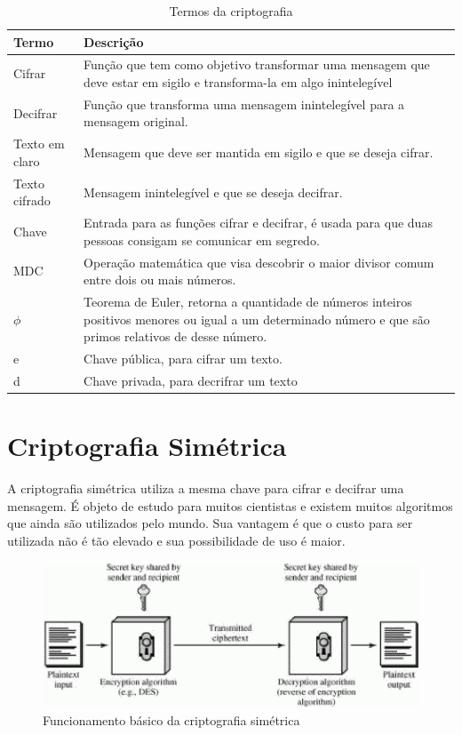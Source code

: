 \begin{table}[h]
\begin{center}
    \begin{tabular}{|l| p{10cm}|}
    \hline
    Termo & Descrição \\ \hline
    Cifrar & Função que tem como objetivo transformar uma mensagem que deve estar em sigilo e transforma-la em algo inintelegível \\ \hline
    Decifrar & Função que transforma uma mensagem inintelegível para a mensagem original. \\ \hline
    Texto em claro & Mensagem que deve ser mantida em sigilo e que se deseja cifrar. \\ \hline
    Texto cifrado & Mensagem inintelegível e que se deseja decifrar. \\ \hline
    Chave & Entrada para as funções cifrar e decifrar, é usada para que duas pessoas consigam se comunicar em segredo. \\ \hline
    MDC & Operação matemática que visa descobrir o maior divisor comum entre dois ou mais números. \\ \hline
    $\phi$ & Teorema de Euler, retorna a quantidade de números inteiros positivos menores ou igual a um determinado número e que são primos relativos de desse número. \\ \hline 
    e & Chave pública, para cifrar um texto. \\ \hline
    d & Chave privada, para decrifrar um texto \\ \hline
    \end{tabular}
    \caption{Termos da criptografia}
\end{center}
\end{table}

%
\section{Criptografia Simétrica}
\label{symmetric-cryptography}

A criptografia simétrica utiliza a mesma chave para cifrar e decifrar uma mensagem. É objeto de estudo para muitos cientistas e existem muitos algoritmos que ainda são utilizados pelo mundo. Sua vantagem é que o custo para ser utilizada não é tão elevado e sua possibilidade de uso é maior. 

\begin{figure}[h]
\centering
\includegraphics[scale=0.5]
{figuras/SymmetricCipher.eps}
\caption[Funcionamento básico da criptografia simétrica] {Funcionamento básico da criptografia simétrica\protect\footnotemark}
\end{figure}

